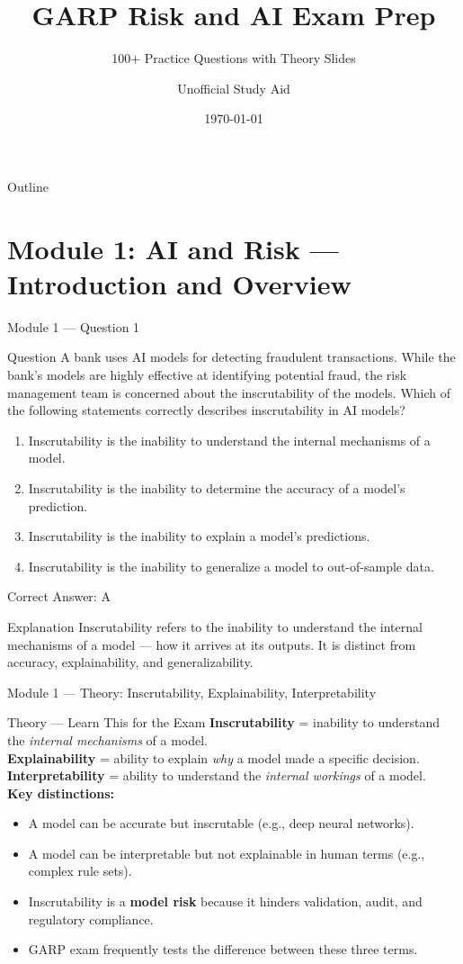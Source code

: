 \documentclass[aspectratio=169,10pt]{beamer}
\title[GARP Risk \& AI]{GARP Risk and AI Exam Prep}
\subtitle{100+ Practice Questions with Theory Slides}
\author[Unofficial]{Unofficial Study Aid}
\institute[GARP Risk \& AI]{Based on the official GARP Risk and AI curriculum}
\date{\today}
\newcommand{\question}[1]{%
	\begin{block}{Question}
		#1
	\end{block}
}
\newcommand{\options}[4]{%
	\begin{enumerate}[label=\Alph*.,leftmargin=*]
		\item #1
		\item #2
		\item #3
		\item #4
	\end{enumerate}
}
\newcommand{\answerbox}[1]{%
	\begin{exampleblock}{Correct Answer: #1}
	\end{exampleblock}
}
\newcommand{\explain}[1]{%
	\begin{block}{Explanation}
		\small #1
	\end{block}
}
\newcommand{\theory}[1]{%
	\begin{block}{Theory --- Learn This for the Exam}
		\small #1
	\end{block}
}
\begin{document}
	
	\begin{frame}
		\titlepage
	\end{frame}
	
	\begin{frame}{Outline}
		\tableofcontents
	\end{frame}
	
	\section{Module 1: AI and Risk --- Introduction and Overview}
	
	\begin{frame}{Module 1 --- Question 1}
		\question{A bank uses AI models for detecting fraudulent transactions. While the bank's models are highly effective at identifying potential fraud, the risk management team is concerned about the inscrutability of the models. Which of the following statements correctly describes inscrutability in AI models?}
		\options{Inscrutability is the inability to understand the internal mechanisms of a model.}{Inscrutability is the inability to determine the accuracy of a model's prediction.}{Inscrutability is the inability to explain a model's predictions.}{Inscrutability is the inability to generalize a model to out-of-sample data.}
		\answerbox{A}
		\explain{Inscrutability refers to the inability to understand the internal mechanisms of a model --- how it arrives at its outputs. It is distinct from accuracy, explainability, and generalizability.}
	\end{frame}
	
	\begin{frame}{Module 1 --- Theory: Inscrutability, Explainability, Interpretability}
		\theory{
			\textbf{Inscrutability} = inability to understand the \emph{internal mechanisms} of a model.\\[2mm]
			\textbf{Explainability} = ability to explain \emph{why} a model made a specific decision.\\[2mm]
			\textbf{Interpretability} = ability to understand the \emph{internal workings} of a model.\\[2mm]
			\textbf{Key distinctions:}
			\begin{itemize}
				\item A model can be accurate but inscrutable (e.g., deep neural networks).
				\item A model can be interpretable but not explainable in human terms (e.g., complex rule sets).
				\item Inscrutability is a \textbf{model risk} because it hinders validation, audit, and regulatory compliance.
				\item GARP exam frequently tests the difference between these three terms.
			\end{itemize}
		}
	\end{frame}
	
\end{document}
